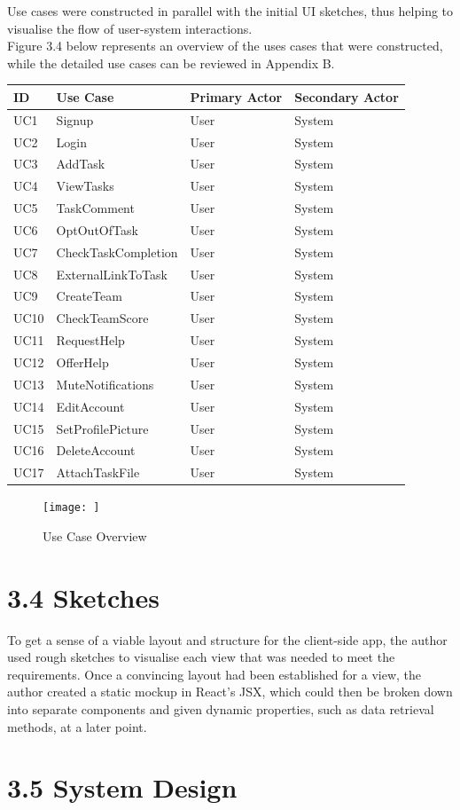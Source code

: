 Use cases were constructed in parallel with the initial UI sketches,
thus helping to visualise the flow of user-system interactions.\\
Figure 3.4 below represents an overview of the uses cases that
were constructed, while the detailed use cases can be reviewed in Appendix B.

\begin{longtable}[]{@{}llll@{}}
\toprule
ID & Use Case & Primary Actor & Secondary Actor\tabularnewline
\midrule
\endhead
UC1 & Signup & User & System\tabularnewline
UC2 & Login & User & System\tabularnewline
UC3 & AddTask & User & System\tabularnewline
UC4 & ViewTasks & User & System\tabularnewline
UC5 & TaskComment & User & System\tabularnewline
UC6 & OptOutOfTask & User & System\tabularnewline
UC7 & CheckTaskCompletion & User & System\tabularnewline
UC8 & ExternalLinkToTask & User & System\tabularnewline
UC9 & CreateTeam & User & System\tabularnewline
UC10 & CheckTeamScore & User & System\tabularnewline
UC11 & RequestHelp & User & System\tabularnewline
UC12 & OfferHelp & User & System\tabularnewline
UC13 & MuteNotifications & User & System\tabularnewline
UC14 & EditAccount & User & System\tabularnewline
UC15 & SetProfilePicture & User & System\tabularnewline
UC16 & DeleteAccount & User & System\tabularnewline
UC17 & AttachTaskFile & User & System\tabularnewline
\bottomrule
\end{longtable}

\begin{figure}[htbp]
\centering
\texttt{[image: ]}
\caption{Use Case Overview}
\end{figure}

\section{3.4 Sketches}\label{sketches}

To get a sense of a viable layout and structure for the client-side app,
the author used rough sketches to visualise each view that was needed to
meet the requirements. Once a convincing layout had been established for
a view, the author created a static mockup in React's JSX, which could
then be broken down into separate components and given dynamic
properties, such as data retrieval methods, at a later point.

\section{3.5 System Design}\label{system-design}

